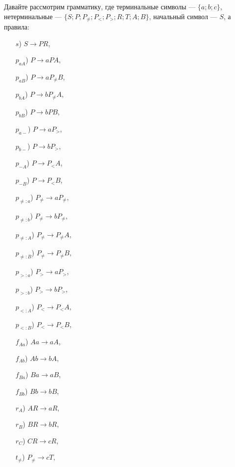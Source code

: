 \documentclass[12pt,a4paper]{article}
\begin{document}
    \begin{problem}{5}
        Давайте рассмотрим грамматику, где терминальные символы --- $\{a; b; c\}$, нетерминальные --- $\{S; P; P_{\neq}; P_<; P_>; R; T; A; B\}$, начальный символ --- $S$, а правила:
        \begin{multicols}{5}
            \begin{itemize}
                \item[$s$)] $S \to PR$,
                \item[$p_{aA}$)] $P \to aPA$,
                \item[$p_{aB}$)] $P \to aP_{\neq} B$,
                \item[$p_{bA}$)] $P \to bP_{\neq} A$,
                \item[$p_{bB}$)] $P \to bPB$,
                \item[$p_{a{-}}$)] $P \to aP_>$,
                \item[$p_{b{-}}$)] $P \to bP_>$,
                \item[$p_{{-}A}$)] $P \to P_< A$,
                \item[$p_{{-}B}$)] $P \to P_< B$,
                \item[$p_{\neq:a}$)] $P_{\neq} \to aP_{\neq}$,
                \item[$p_{\neq:b}$)] $P_{\neq} \to bP_{\neq}$,
                \item[$p_{\neq:A}$)] $P_{\neq} \to P_{\neq} A$,
                \item[$p_{\neq:B}$)] $P_{\neq} \to P_{\neq} B$,
                \item[$p_{>:a}$)] $P_> \to aP_>$,
                \item[$p_{>:b}$)] $P_> \to bP_>$,
                \item[$p_{<:A}$)] $P_< \to P_< A$,
                \item[$p_{<:B}$)] $P_< \to P_< B$,
                \item[$f_{Aa}$)] $Aa \to aA$,
                \item[$f_{Ab}$)] $Ab \to bA$,
                \item[$f_{Ba}$)] $Ba \to aB$,
                \item[$f_{Bb}$)] $Bb \to bB$,
                \item[$r_A$)] $AR \to aR$,
                \item[$r_B$)] $BR \to bR$,
                \item[$r_C$)] $CR \to cR$,
                \item[$t_{\neq}$)] $P_{\neq} \to cT$,

\end{itemize}
\end{multicols}
\end{problem}
\end{document}
